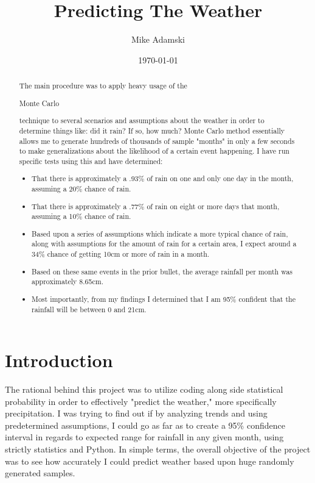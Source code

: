 \documentclass[twocolumn]{revtex4}
\begin{document}
\title{
Predicting The Weather
}

\author{Mike Adamski}

\date{\today}

\begin{abstract}
    The main procedure was to apply heavy usage of the \begin{it} Monte Carlo \end{it} technique to several scenarios and assumptions about the weather in order to determine things like: did it rain? If so, how much? Monte Carlo method essentially allows me to generate hundreds of thousands of sample "months" in only a few seconds to make generalizations about the likelihood of a certain event happening. I have run specific tests using this and have determined: 
\begin{itemize} %
	\item That there is approximately a .93\% of rain on one and only one day in the month, assuming a 20\% chance of rain.
    \item That there is approximately a .77\% of rain on eight or more days that month, assuming a 10\% chance of rain. 
    \item Based upon a series of assumptions which indicate a more typical chance of rain, along with assumptions for the amount of rain for a certain area, I expect around a 34\% chance of getting 10cm or more of rain in a month.
    \item Based on these same events in the prior bullet, the average rainfall per month was approximately 8.65cm.
    \item Most importantly, from my findings I determined that I am 95\% confident that the rainfall will be between 0 and 21cm.
\end{itemize}

\end{abstract}

\maketitle

\section{Introduction}
	The rational behind this project was to utilize coding along side statistical probability in order to effectively "predict the weather," more specifically precipitation. I was trying to find out if by analyzing trends and using predetermined assumptions, I could go as far as to create a 95\% confidence interval in regards to expected range for rainfall in any given month, using strictly statistics and Python. In simple terms, the overall objective of the project was to see how accurately I could predict weather based upon huge randomly generated samples. 
\end{document}
